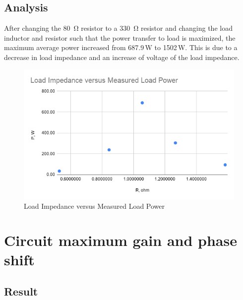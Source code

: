 \documentclass{article}
\begin{document}
\subsection*{Analysis}
After changing the \SI{80}{\ohm} resistor to a \SI{330}{\ohm} resistor and changing the load inductor and resistor such that the power transfer to load is maximized, the maximum average power increased from 687.9\,W to 1502\,W. This is due to a decrease in load impedance and an increase of voltage of the load impedance.
\begin{figure}[H]
    \centering
        \includegraphics[scale=0.45]{ECE2101L_Lab12_B1_plot.png}
        \caption{Load Impedance versus Measured Load Power}
\end{figure}

\section{Circuit maximum gain and phase shift}

\subsection*{Result}
\begin{table}[H]
\end{table}
\end{document}
